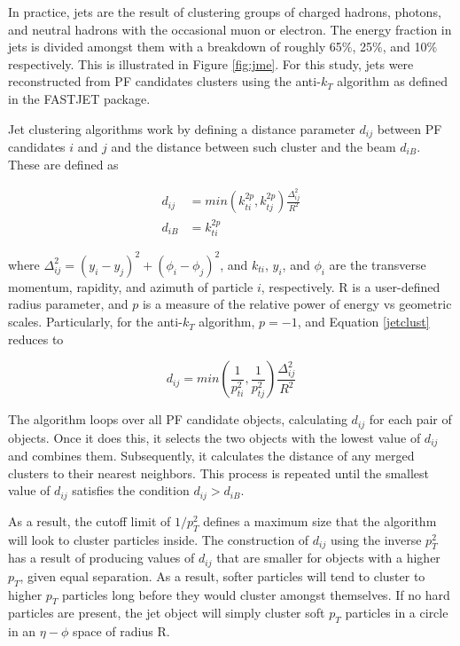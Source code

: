 In practice, jets are the result of clustering groups of charged hadrons, photons, and neutral hadrons with the occasional muon or electron. The energy fraction in jets is divided amongst them with a breakdown of roughly 65$\%$, 25$\%$, and 10$\%$ respectively. This is illustrated in Figure \ref{fig:jme}. For this study, jets were reconstructed from PF candidates clusters using the anti-$k_{T}$ algorithm\cite{Cacciari:2008gp} as defined in the FASTJET package\cite{Cacciari:2011ma}.


 Jet clustering algorithms work by defining a distance parameter $d_{ij}$ between PF candidates $i$ and $j$ and the distance between such cluster and the beam $d_{iB}$. These are defined as

 \begin{align}
 \label{jetclust}
 d_{ij} &= min(k_{ti}^{2p},k_{tj}^{2p})\frac{\Delta_{ij}^{2}}{R^{2}}\\
 d_{iB} &= k_{ti}^{2p}
 \end{align}

where $\Delta_{ij}^{2} = (y_{i}-y_{j})^{2}+(\phi_{i}-\phi_{j})^{2}$, and $k_{ti}$, $y_{i}$, and $\phi_{i}$ are the transverse momentum, rapidity, and azimuth of particle $i$, respectively. R is a user-defined radius parameter, and $p$ is a measure of the relative power of energy vs geometric scales. Particularly, for the anti-$k_{T}$ algorithm, $p=-1$, and Equation \ref{jetclust} reduces to

\begin{equation}
d_{ij} = min(\frac{1}{p_{ti}^{2}},\frac{1}{p_{tj}^{2}})\frac{\Delta_{ij}^{2}}{R^{2}}
\end{equation}

The algorithm\cite{Cacciari:2011ma} loops over all PF candidate objects, calculating $d_{ij}$ for each pair of objects. Once it does this, it selects the two objects with the lowest value of $d_{ij}$ and combines them. Subsequently, it calculates the distance of any merged clusters to their nearest neighbors. This process is repeated until the smallest value of $d_{ij}$ satisfies the condition $d_{ij}>d_{iB}$.

As a result, the cutoff limit of $1/p_{T}^{2}$ defines a maximum size that the algorithm will look to cluster particles inside. The construction of $d_{ij}$ using the inverse $p_{T}^{2}$ has a result of producing values of $d_{ij}$ that are smaller for objects with a higher $p_{T}$, given equal separation. As a result, softer particles will tend to cluster to higher $p_{T}$ particles long before they would cluster amongst themselves. If no hard particles are present, the jet object will simply cluster soft $p_{T}$ particles in a circle in an $\eta-\phi$ space of radius R.

